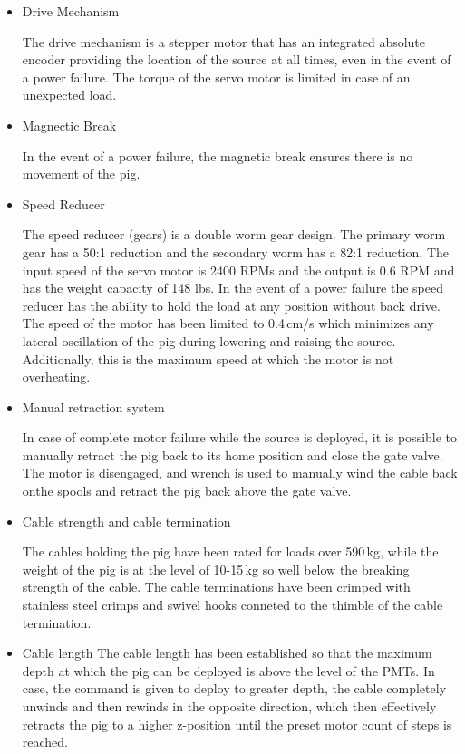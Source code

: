  \begin{itemize}
  \item{Drive Mechanism}
 
   The drive mechanism is a stepper motor that has an integrated absolute encoder providing the location of the source at all times, even in the event of a power failure. The torque of the servo motor is limited in case of an unexpected load.

 \item{Magnectic Break}
 
  In the event of a power failure, the magnetic break ensures there is no movement of the pig. 
  
  \item{Speed Reducer}
  
  The speed reducer (gears) is a double worm gear design. The primary worm gear has a 50:1 reduction and the secondary worm has a 82:1 reduction. The input speed of the servo motor is 2400 RPMs and the output is 0.6 RPM and has the weight capacity of 148 lbs. In the event of a power failure the speed reducer has the ability to hold the load at any position without back drive. The speed of the motor has been limited to 0.4\,cm/s which minimizes any lateral oscillation of the pig during lowering and raising the source. Additionally, this is the maximum speed at which the motor is not overheating.
	
\item{Manual retraction system}

In case of complete motor failure while the source is deployed, it is possible to manually retract the pig back to its home position and close the gate valve. The motor is disengaged, and wrench is used to manually wind the cable back onthe spools and retract the pig back above the gate valve.

\item{Cable strength and cable termination}

The cables holding the pig have been rated for loads over 590\,kg, while the weight of the pig is at the level of 10-15\,kg so well below the breaking strength of the cable. The cable terminations have been crimped with stainless steel crimps and swivel hooks conneted to the thimble of the cable termination.

\item{Cable length}
The cable length has been established so that the maximum depth at which the pig can be deployed is above the level of the PMTs. In case, the command is given to deploy to greater depth, the cable completely unwinds and then rewinds in the opposite direction, which then effectively retracts the pig to a higher z-position until the preset motor count of steps is reached. 


\end{itemize}
